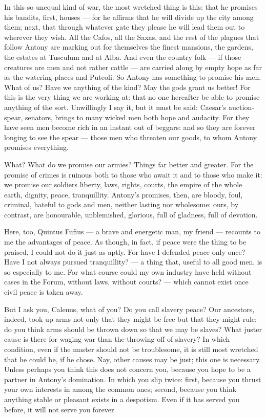  In this so unequal kind of war, the most wretched thing is this: that he promises his bandits, first, houses --- for he affirms that he will divide up the city among them; next, that through whatever gate they please he will lead them out to wherever they wish. All the Cafos, all the Saxas, and the rest of the plagues that follow Antony are marking out for themselves the finest mansions, the gardens, the estates at Tusculum and at Alba. And even the country folk --- if those creatures are men and not rather cattle --- are carried along by empty hope as far as the watering-places and Puteoli. So Antony has something to promise his men. What of us? Have we anything of the kind? May the gods grant us better! For this is the very thing we are working at: that no one hereafter be able to promise anything of the sort. Unwillingly I say it, but it must be said: Caesar's auction-spear, senators, brings to many wicked men both hope and audacity. For they have seen men become rich in an instant out of beggars: and so they are forever longing to see the spear --- those men who threaten our goods, to whom Antony promises everything.

 What? What do we promise our armies? Things far better and greater. For the promise of crimes is ruinous both to those who await it and to those who make it: we promise our soldiers liberty, laws, rights, courts, the empire of the whole earth, dignity, peace, tranquillity. Antony's promises, then, are bloody, foul, criminal, hateful to gods and men, neither lasting nor wholesome: ours, by contrast, are honourable, unblemished, glorious, full of gladness, full of devotion.

 Here, too, Quintus Fufius --- a brave and energetic man, my friend --- recounts to me the advantages of peace. As though, in fact, if peace were the thing to be praised, I could not do it just as aptly. For have I defended peace only once? Have I not always pursued tranquillity? --- a thing that, useful to all good men, is so especially to me. For what course could my own industry have held without cases in the Forum, without laws, without courts? --- which cannot exist once civil peace is taken away.

 But I ask you, Calenus, what of you? Do you call slavery peace? Our ancestors, indeed, took up arms not only that they might be free but that they might rule: do you think arms should be thrown down so that we may be slaves? What juster cause is there for waging war than the throwing-off of slavery? In which condition, even if the master should not be troublesome, it is still most wretched that he could be, if he chose. Nay, other causes may be just; this one is necessary. Unless perhaps you think this does not concern you, because you hope to be a partner in Antony's domination. In which you slip twice: first, because you thrust your own interests in among the common ones; second, because you think anything stable or pleasant exists in a despotism. Even if it has served you before, it will not serve you forever.

